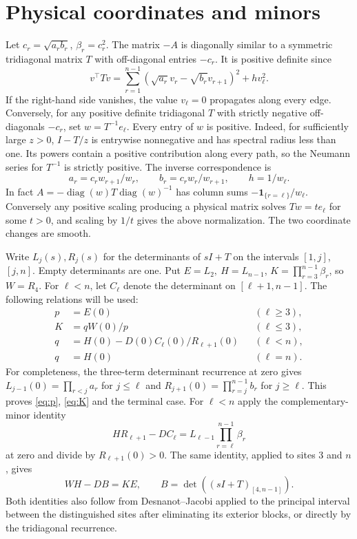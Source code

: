 \documentclass[11pt,a4paper]{article}
\newcommand{\id}{\mathbf 1}
\newcommand{\diag}{\operatorname{diag}}
\begin{document}
\section{Physical coordinates and minors}
Let \(c_r=\sqrt{a_rb_r}\), \(\beta_r=c_r^2\). The matrix \(-A\) is
diagonally similar to a symmetric tridiagonal matrix \(T\) with off-diagonal
entries \(-c_r\). It is positive definite since
\[
 v^\top T v=\sum_{r=1}^{n-1}
   (\sqrt{a_r}v_r-\sqrt{b_r}v_{r+1})^2+h v_\ell^2.
\]
If the right-hand side vanishes, the value \(v_\ell=0\) propagates along
every edge. Conversely, for any positive definite tridiagonal \(T\) with
strictly negative off-diagonals \(-c_r\), set \(w=T^{-1}e_\ell\).
Every entry of \(w\) is positive. Indeed, for sufficiently large \(z>0\),
\(I-T/z\) is entrywise nonnegative and has spectral radius less than one.
Its powers contain a positive contribution along every path, so the Neumann
series for \(T^{-1}\) is strictly positive. The inverse correspondence is
\begin{equation}\label{eq:gauge}
 a_r=c_r w_{r+1}/w_r,\qquad b_r=c_r w_r/w_{r+1},\qquad h=1/w_\ell .
\end{equation}
In fact \(A=-\diag(w)T\diag(w)^{-1}\) has column sums
\(-\id_{\{r=\ell\}}/w_\ell\). Conversely any positive scaling producing a
physical matrix solves \(Tw=t e_\ell\) for some \(t>0\), and scaling by
\(1/t\) gives the above normalization. The two coordinate changes are smooth.

Write \(L_j(s),R_j(s)\) for the determinants of \(sI+T\) on the intervals
\([1,j]\), \([j,n]\). Empty determinants are one. Put \(E=L_2,\ H=L_{n-1}\),
\(K=\prod_{r=3}^{n-1}\beta_r\), so \(W=R_4\). For \(\ell<n\), let \(C_\ell\)
denote the determinant on \([\ell+1,n-1]\). The following relations will be used:
\begin{align}
 p&=E(0) &&(\ell\ge3),\label{eq:p}\\
 K&=qW(0)/p &&(\ell\le3),\label{eq:K}\\
 q&=H(0)-D(0)C_\ell(0)/R_{\ell+1}(0) &&(\ell<n),\label{eq:q}\\
 q&=H(0) &&(\ell=n).\nonumber
\end{align}
For completeness, the three-term determinant recurrence at zero gives
\(L_{j-1}(0)=\prod_{r<j} a_r\) for \(j\le\ell\) and
\(R_{j+1}(0)=\prod_{r=j}^{n-1} b_r\) for \(j\ge\ell\). This proves
\eqref{eq:p}, \eqref{eq:K} and the terminal case. For \(\ell<n\) apply
the complementary-minor identity
\[
 H R_{\ell+1}-D C_\ell=L_{\ell-1}\prod_{r=\ell}^{n-1}\beta_r
\]
at zero and divide by \(R_{\ell+1}(0)>0\). The same identity, applied to sites
3 and \(n\), gives
\begin{equation}\label{eq:minor}
 WH-DB=K E,\qquad B=\det((sI+T)_{[4,n-1]}).
\end{equation}
Both identities also follow from Desnanot--Jacobi applied to the principal
interval between the distinguished sites after eliminating its exterior
blocks, or directly by the tridiagonal recurrence.
\end{document}
